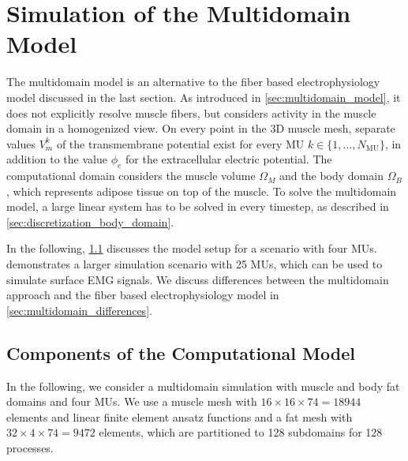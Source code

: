 

%
\section{Simulation of the Multidomain Model}\label{sec:solver_multidomain_model}

The multidomain model is an alternative to the fiber based electrophysiology model discussed in the last section.
As introduced in \cref{sec:multidomain_model}, it does not explicitly resolve muscle fibers, but considers activity in the muscle domain in a homogenized view.
On every point in the 3D muscle mesh, separate values $V_m^k$ of the transmembrane potential exist for every MU $k \in \{1,\dots,N_\text{MU}\}$, in addition to the value $\phi_e$ for the extracellular electric potential. 
The computational domain considers the muscle volume $\Omega_M$ and the body domain $\Omega_B$, which represents  adipose tissue on top of the muscle.
To solve the multidomain model, a large linear system has to be solved in every timestep, as described in \cref{sec:discretization_body_domain}.

In the following, \cref{sec:multidomain_components} discusses the model setup for a scenario with four MUs.  demonstrates a larger simulation scenario with 25 MUs, which can be used to simulate surface EMG signals. We discuss differences between the multidomain approach and the fiber based electrophysiology model in \cref{sec:multidomain_differences}.

\subsection{Components of the Computational Model}\label{sec:multidomain_components}

In the following, we consider a multidomain simulation with muscle and body fat domains and four MUs. We use a muscle mesh with $16 \times 16 \times 74 = \num{18944}$ elements and linear finite element ansatz functions and a fat mesh with $32 \times 4 \times 74 = \num{9472}$ elements, which are partitioned to 128 subdomains for 128 processes. 

